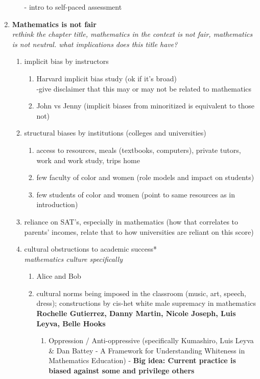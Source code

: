 \begin{enumerate}
\begin{enumerate}
      - intro to self-paced assessment
  \end{enumerate}
  \item {\bf Mathematics is not fair }\\
  {\it rethink the chapter title, mathematics in the context is not fair, mathematics is not neutral. what implications does this title have?}
  \begin{enumerate}
    \item implicit bias by instructors
    \begin{enumerate}
      \item Harvard implicit bias study (ok if it's broad)\\
      -give disclaimer that this may or may not be related to mathematics
      \item John vs Jenny (implicit biases from minoritized is equivalent to those not)
    \end{enumerate}
    \item structural biases by institutions (colleges and universities)
    \begin{enumerate}
      \item access to resources, meals (textbooks, computers), private tutors, work and work study, trips home
      \item few faculty of color and women (role models and impact on students)
      \item few students of color and women (point to same resources as in introduction)
    \end{enumerate}
    \item reliance on SAT's, especially in mathematics (how that correlates to parents' incomes, relate that to how universities are reliant on this score)
    \item cultural obstructions to academic success*\\
    {\it mathematics culture specifically}
    \begin{enumerate}
      \item Alice and Bob
      \item cultural norms being imposed in the classroom (music, art, speech, dress); constructions by cis-het white male supremacy in mathematics {\bf Rochelle Gutierrez, Danny Martin, Nicole Joseph, Luis Leyva, Belle Hooks}
      \begin{enumerate}
        \item Oppression / Anti-oppressive (specifically Kumashiro, Luis Leyva \& Dan Battey - A Framework for Understanding Whiteness in Mathematics Education) - {\bf Big idea: Current practice is biased against some and privilege others}

\end{enumerate}
\end{enumerate}
\end{enumerate}
\end{enumerate}

